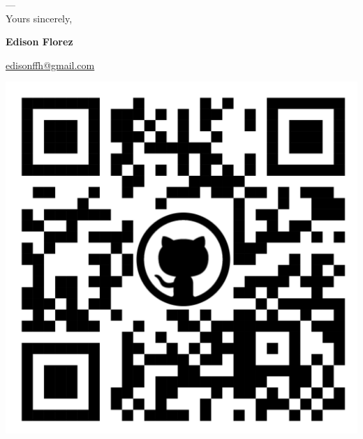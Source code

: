 \vfill
\begin{minipage}[c]{.75\textwidth}
    ---\\
    Yours sincerely,

    \vspace*{3mm}

    \textbf{Edison Florez}

    \href{mailto:edisonffh@gmail.com}{edisonffh@gmail.com}


\end{minipage}
\begin{minipage}[c]{.2\textwidth}
    \centering
    \href{https://github.com/e-florez/}{
        \includegraphics[scale=0.02]{figs/qrcode_github_page.png}
    }
\end{minipage}

